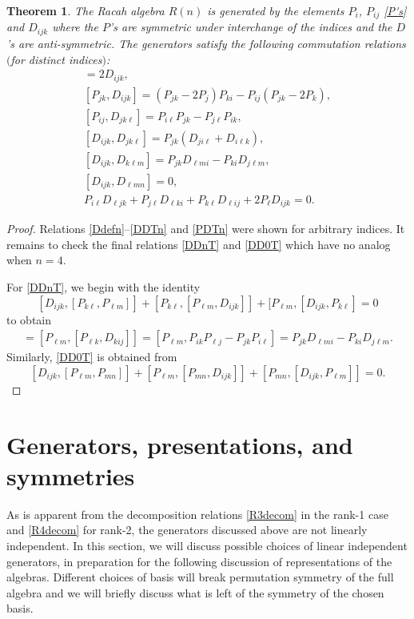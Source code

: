 \documentclass[10pt,a4paper]{amsart}
\numberwithin{equation}{section}
\newtheorem{Theorem}{Theorem}[section]
\begin{document}
\begin{Theorem}
\label{bigthmn2} The Racah algebra $R(n)$ is generated by the elements $P_i$, $P_{ij}$ \eqref{P's} and $D_{ijk}$ where the $P$'s are symmetric under interchange of the indices and the $D$'s are anti-symmetric. The generators satisfy the following commutation relations $($for distinct indices$)$:
\begin{gather}%
[P_{ij}, P_{jk}]=2 D_{ijk}, \label{Ddefn}\\
[P_{jk},D_{ijk}]=  (P_{jk}-2P_j )P_{ki}-P_{ij} (P_{jk}-2P_{k} ),\\
[P_{ij}, D_{jk\ell}] =P_{i\ell}P_{jk}-P_{j\ell}P_{ik},\\
[D_{ijk}, D_{jk\ell}] = P_{jk} (D_{ji\ell} +D_{i\ell k} ),\label{DDTn}\\
[D_{ijk}, D_{k\ell m }] = P_{jk}D_{\ell mi} - P_{ki}D_{j \ell m},\label{DDnT}\\
[D_{ijk}, D_{\ell m n}] = 0,\label{DD0T}\\
P_{i\ell}D_{\ell jk}+ P_{j\ell} D_{\ell ki}+P_{k\ell}D_{\ell ij}+2P_{\ell}D_{ijk}=0.\label{PDTn}
\end{gather}
\end{Theorem}
\begin{proof}
Relations \eqref{Ddefn}--\eqref{DDTn} and \eqref{PDTn} were shown for arbitrary indices. It remains to check the final relations \eqref{DDnT} and \eqref{DD0T} which have no analog when $n=4$.

For \eqref{DDnT}, we begin with the identity
\[ [D_{ijk}, [P_{k\ell}, P_{\ell m} ]] + [P_{k\ell}, [ P_{\ell m}, D_{ijk}]] + [P_{\ell m},[D_{ijk}, P_{k\ell}]=0\]
to obtain
\begin{align*}
  [D_{ijk}, D_{k\ell m}]= [P_{\ell m}, [P_{\ell k}, D_{kij}]]
  =[ P_{\ell m}, P_{ik} P_{\ell j} - P_{jk}P_{i\ell}]
  = P_{jk}D_{\ell mi} - P_{ki}D_{j \ell m}.
\end{align*}
Similarly, \eqref{DD0T} is obtained from
\[ [D_{ijk}, [P_{\ell m }, P_{ mn} ]] + [P_{\ell m}, [ P_{ m n}, D_{ijk}]] + [P_{m n},[D_{ijk}, P_{\ell m}]]=0.\tag*{\qed}
\]\renewcommand{\qed}{}
\end{proof}


\section{Generators, presentations, and symmetries}
\label{gen}
As is apparent from the decomposition relations \eqref{R3decom} in the rank-1 case and \eqref{R4decom} for rank-2, the generators discussed above are not linearly independent. In this section, we will discuss possible choices of linear independent generators, in preparation for the following discussion of representations of the algebras. Different choices of basis will break permutation symmetry of the full algebra and we will briefly discuss what is left of the symmetry of the chosen basis.
\end{document}
